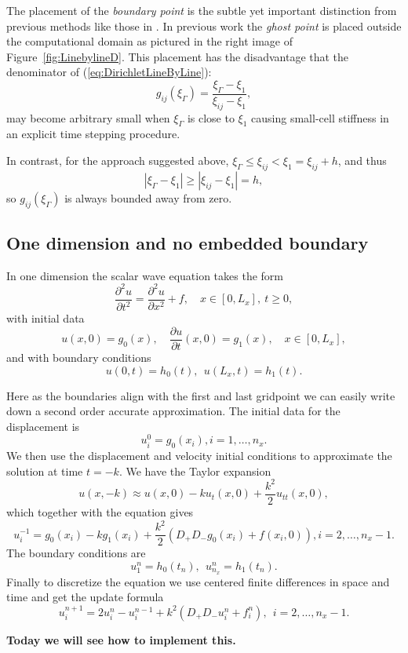 \documentclass[11pt]{article}
\newcommand{\fig}[1]{\mbox{Figure{~#1}}}
\newcommand{\be}{\begin{equation}}
\newcommand{\ee}{\end{equation}}
\newcommand{\bd}{\begin{displaymath}}
\newcommand{\ed}{\end{displaymath}}
\newcommand{\pa}{\partial}
\newcommand{\f}{\frac}
\newcommand{\dpx}{D_+}
\newcommand{\dmx}{D_-}
\begin{document}
The placement of the \emph{boundary point} is the subtle yet important distinction from previous
methods like those in \cite{Kreiss_Petersson_2006,kreiss:1940,kreiss:1292}. In previous work the \emph{ghost point} is placed outside the
computational domain as pictured in the right image of \fig{\ref{fig:LinebylineD}}. This placement
has the disadvantage that the denominator of (\ref{eq:DirichletLineByLine}):
%
\bd
g_{ij}(\xi_\Gamma) = \f{\xi_\Gamma-\xi_{1}}{\xi_{ij}-\xi_{1}},
\ed
%
may become arbitrary small when $\xi_\Gamma$ is close to $\xi_{1}$ causing small-cell stiffness in
an explicit time stepping procedure.

In contrast, for the approach suggested above, $\xi_\Gamma \le \xi_{ij} < \xi_1 = \xi_{ij}+h$, and thus  
%
\bd
| \xi_\Gamma - \xi_1|  \ge | \xi_{ij} - \xi_1|  = h,
\ed  
%
so $g_{ij}(\xi_\Gamma)$ is always bounded away from zero. 

\subsection{One dimension and no embedded boundary}
In one dimension the scalar wave equation takes the form
%
\be \label{eq:weq1d} 
\f{\pa^2 u}{\pa t^2} =
\f{\pa^2 u}{\pa x^2} + f,\quad x \in [0,L_x],\ t\geq 0,
\ee 
%
with initial data 
%
\be \label{eq:weqid1d} 
u(x,0) = g_0(x), \quad \f{\pa u}{\pa t}(x,0) = g_1(x), \quad x \in [0,L_x],
\ee 
and with boundary conditions 
\be
u(0,t) = h_0(t), \ \ u(L_x,t) = h_1(t).
\ee

Here as the boundaries align with the first and last gridpoint we can easily write down a second order accurate approximation. The initial data for the displacement is
\[
u^0_{i} = g_0({x_i}),  i = 1,\ldots,n_x. 
\]
We then use the displacement and velocity initial conditions to approximate the solution at time $t = -k$. We have the Taylor expansion 
\[
	u(x,-k) \approx u(x,0) - k u_t(x,0) + \frac{k^2}{2} u_{tt}(x,0),
\]
which together with the equation gives 
\[
u^{-1}_{i} = g_0({x_i}) - k g_1({x_i}) +\frac{k^2}{2} \left( \dpx \dmx g_0(x_i)  + f(x_i,0) \right) ,  i = 2,\ldots,n_x-1. 
\]
The boundary conditions are
\[
u^n_{1} = h_0(t_n), \ \  u^n_{n_x} = h_1(t_n).
\]
Finally to discretize the equation we use centered finite differences in space and time and get the update formula
\be
u^{n+1}_i = 2u^n_i - u^{n-1}_i +k^2(\dpx \dmx u^n_i + f^n_i), \ \  i = 2,\ldots,n_x-1. 
\ee

{\bf Today we will see how to implement this.}
\end{document}
